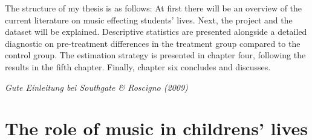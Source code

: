 \documentclass[a4, 12pt]{article}
\begin{document}
The structure of my thesis is as follows: At first there will be an overview of the current literature on music effecting students' lives. Next, the project and the dataset will be explained. Descriptive statistics are presented alongside a detailed diagnostic on pre-treatment differences in the treatment group compared to the control group. The estimation strategy is presented in chapter four, following the results in the fifth chapter. Finally, chapter six concludes and discusses.

\emph{Gute Einleitung bei Southgate \& Roscigno (2009)}

\clearpage

\hypertarget{the-role-of-music-in-childrens-lives}{%
\section{The role of music in childrens' lives}\label{the-role-of-music-in-childrens-lives}}
\end{document}
